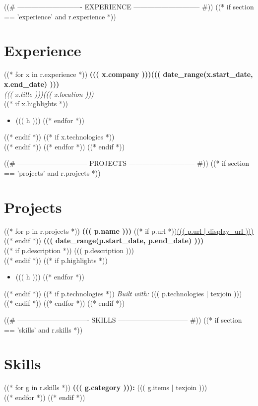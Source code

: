 \documentclass[10pt,letterpaper]{article}
\newcommand{\entryheading}[4]{%
  \needspace{3\baselineskip}%
  \textbf{#1}\hfill\textbf{#2}\\%
  \textit{\color{muted}#3}\hfill\textit{\color{muted}#4}\\[2pt]%
}
\begin{document}
((# ---------------------------- EXPERIENCE ----------------------------- #))
((* if section == 'experience' and r.experience *))
\section{Experience}
((* for x in r.experience *))
\entryheading
  {((( x.company )))}
  {((( date_range(x.start_date, x.end_date) )))}
  {((( x.title )))}
  {((( x.location )))}
((* if x.highlights *))
\begin{itemize}
((* for h in x.highlights *))
  \item ((( h )))
((* endfor *))
\end{itemize}
((* endif *))
((* if x.technologies *))
\\
((* endif *))
\vspace{3pt}
((* endfor *))
((* endif *))

((# ------------------------------ PROJECTS ----------------------------- #))
((* if section == 'projects' and r.projects *))
\section{Projects}
((* for p in r.projects *))
\textbf{((( p.name )))}%
((* if p.url *))\hspace{6pt}\href{((( p.url | url )))}{\small ((( p.url | display_url )))}((* endif *))%
\hfill\textbf{((( date_range(p.start_date, p.end_date) )))}\\
((* if p.description *))
{\color{muted}((( p.description )))}\\[2pt]
((* endif *))
((* if p.highlights *))
\begin{itemize}
((* for h in p.highlights *))
  \item ((( h )))
((* endfor *))
\end{itemize}
((* endif *))
((* if p.technologies *))
{\small\textit{Built with:} ((( p.technologies | texjoin )))}\\
((* endif *))
\vspace{3pt}
((* endfor *))
((* endif *))

((# ------------------------------- SKILLS ------------------------------ #))
((* if section == 'skills' and r.skills *))
\section{Skills}
((* for g in r.skills *))
\textbf{((( g.category ))):} ((( g.items | texjoin )))\\[1pt]
((* endfor *))
((* endif *))
\end{document}
